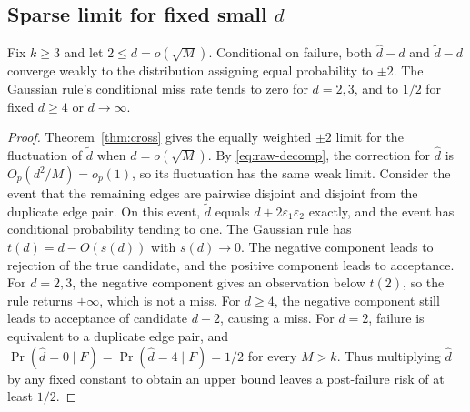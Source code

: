 \subsection{Sparse limit for fixed small \texorpdfstring{$d$}{d}}
\begin{proposition}[Limit when $d=o(\sqrt M)$]\label{prop:smalld}
Fix $k\ge3$ and let $2\le d=o(\sqrt M)$. Conditional on failure, both $\widehat d-d$ and $\widetilde d-d$ converge weakly to the distribution assigning equal probability to $\pm2$. The Gaussian rule's conditional miss rate tends to zero for $d=2,3$, and to $1/2$ for fixed $d\ge4$ or $d\to\infty$.
\end{proposition}

\begin{proof}
Theorem~\ref{thm:cross} gives the equally weighted $\pm2$ limit for the fluctuation of $\widetilde d$ when $d=o(\sqrt M)$. By \eqref{eq:raw-decomp}, the correction for $\widehat d$ is $O_p(d^2/M)=o_p(1)$, so its fluctuation has the same weak limit. Consider the event that the remaining edges are pairwise disjoint and disjoint from the duplicate edge pair. On this event, $\widetilde d$ equals $d+2\varepsilon_1\varepsilon_2$ exactly, and the event has conditional probability tending to one. The Gaussian rule has $t(d)=d-O(s(d))$ with $s(d)\to0$. The negative component leads to rejection of the true candidate, and the positive component leads to acceptance. For $d=2,3$, the negative component gives an observation below $t(2)$, so the rule returns $+\infty$, which is not a miss. For $d\ge4$, the negative component still leads to acceptance of candidate $d-2$, causing a miss. For $d=2$, failure is equivalent to a duplicate edge pair, and $\Pr(\widehat d=0\mid F)=\Pr(\widehat d=4\mid F)=1/2$ for every $M>k$. Thus multiplying $\widehat d$ by any fixed constant to obtain an upper bound leaves a post-failure risk of at least $1/2$.
\end{proof}

